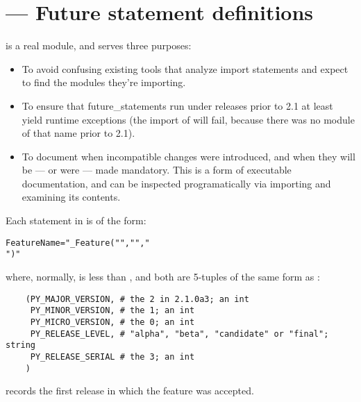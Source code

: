 \section{ ---
         Future statement definitions}


 is a real module, and serves three purposes:

\begin{itemize}

\item To avoid confusing existing tools that analyze import statements
      and expect to find the modules they're importing.

\item To ensure that future_statements run under releases prior to 2.1
      at least yield runtime exceptions (the import of
       will fail, because there was no module of
      that name prior to 2.1). 

\item To document when incompatible changes were introduced, and when they
      will be --- or were --- made mandatory.  This is a form of executable
      documentation, and can be inspected programatically via importing
       and examining its contents.

\end{itemize}

Each statement in  is of the form:

\begin{alltt}
FeatureName = "_Feature("  ","  ","
                         ")"
\end{alltt}

where, normally,  is less than
, and both are 5-tuples of the same form as
:

\begin{verbatim}
    (PY_MAJOR_VERSION, # the 2 in 2.1.0a3; an int
     PY_MINOR_VERSION, # the 1; an int
     PY_MICRO_VERSION, # the 0; an int
     PY_RELEASE_LEVEL, # "alpha", "beta", "candidate" or "final"; string
     PY_RELEASE_SERIAL # the 3; an int
    )
\end{verbatim}

 records the first release in which the feature
was accepted.


